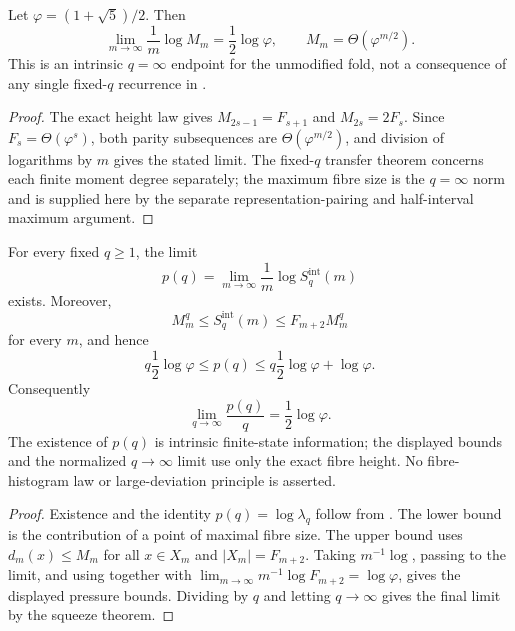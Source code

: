 \begin{corollary}
\label{cor:linfty-fold-entropy}
Let \(\varphi=(1+\sqrt5)/2\).  Then
\[
  \lim_{m\to\infty}\frac1m\log M_m=\frac12\log\varphi,
  \qquad
  M_m=\Theta(\varphi^{m/2}).
\]
This is an intrinsic \(q=\infty\) endpoint for the unmodified fold, not a
consequence of any single fixed-\(q\) recurrence in
.
\end{corollary}

\begin{proof}
The exact height law gives \(M_{2s-1}=F_{s+1}\) and \(M_{2s}=2F_s\).  Since
\(F_s=\Theta(\varphi^s)\), both parity subsequences are
\(\Theta(\varphi^{m/2})\), and division of logarithms by \(m\) gives the stated
limit.  The fixed-\(q\) transfer theorem concerns each finite moment degree
separately; the maximum fibre size is the \(q=\infty\) norm and is supplied here
by the separate representation-pairing and half-interval maximum argument.
\end{proof}

\begin{theorem}
\label{thm:zero-temperature-fold-pressure}
\label{thm:height-squeeze-endpoint}
For every fixed \(q\ge1\), the limit
\[
  p(q)=\lim_{m\to\infty}\frac1m\log S_q^{\mathrm{int}}(m)
\]
exists.  Moreover,
\[
  M_m^q\le S_q^{\mathrm{int}}(m)\le F_{m+2}M_m^q
\]
for every \(m\), and hence
\[
  q\frac12\log\varphi\le p(q)
  \le q\frac12\log\varphi+\log\varphi .
\]
Consequently
\[
  \lim_{q\to\infty}\frac{p(q)}q=\frac12\log\varphi .
\]
The existence of \(p(q)\) is intrinsic finite-state information; the displayed
bounds and the normalized \(q\to\infty\) limit use only the exact fibre height.
No fibre-histogram law or large-deviation principle is asserted.
\end{theorem}

\begin{proof}
Existence and the identity \(p(q)=\log\lambda_q\) follow from
.  The lower bound is the
contribution of a point of maximal fibre size.  The upper
bound uses \(d_m(x)\le M_m\) for all \(x\in X_m\) and
\(|X_m|=F_{m+2}\).  Taking \(m^{-1}\log\), passing to the limit, and using
 together with
\(\lim_{m\to\infty}m^{-1}\log F_{m+2}=\log\varphi\), gives the displayed
pressure bounds.  Dividing by \(q\) and letting \(q\to\infty\) gives the final
limit by the squeeze theorem.
\end{proof}

